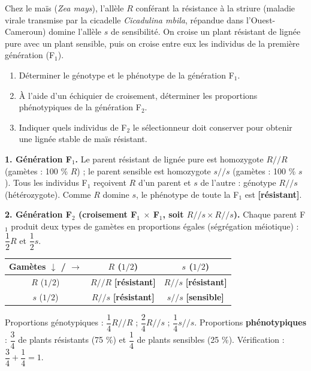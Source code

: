 \documentclass[11pt]{article}
\begin{document}
\begin{exoresolu}
Chez le maïs (\emph{Zea mays}), l'allèle $R$ conférant la résistance à la striure (maladie virale transmise par la cicadelle \emph{Cicadulina mbila}, répandue dans l'Ouest-Cameroun) domine l'allèle $s$ de sensibilité. On croise un plant résistant de lignée pure avec un plant sensible, puis on croise entre eux les individus de la première génération (F$_1$).
\begin{enumerate}
\item Déterminer le génotype et le phénotype de la génération F$_1$.
\item À l'aide d'un échiquier de croisement, déterminer les proportions phénotypiques de la génération F$_2$.
\item Indiquer quels individus de F$_2$ le sélectionneur doit conserver pour obtenir une lignée stable de maïs résistant.
\end{enumerate}
\tcblower
\textbf{1. Génération F$_1$.} Le parent résistant de lignée pure est homozygote $R/\!/R$ (gamètes : 100 \% $R$) ; le parent sensible est homozygote $s/\!/s$ (gamètes : 100 \% $s$). Tous les individus F$_1$ reçoivent $R$ d'un parent et $s$ de l'autre : génotype $R/\!/s$ (hétérozygote). Comme $R$ domine $s$, le phénotype de toute la F$_1$ est \textbf{[résistant]}.

\textbf{2. Génération F$_2$ (croisement F$_1$ $\times$ F$_1$, soit $R/\!/s \times R/\!/s$).} Chaque parent F$_1$ produit deux types de gamètes en proportions égales (ségrégation méiotique) : $\dfrac{1}{2} R$ et $\dfrac{1}{2} s$.

\begin{center}
\begin{tabular}{|c|c|c|}
\hline
\rowcolor{popblueL} Gamètes $\downarrow$ / $\rightarrow$ & $R$ ($1/2$) & $s$ ($1/2$) \\
\hline
$R$ ($1/2$) & $R/\!/R$ \textbf{[résistant]} & $R/\!/s$ \textbf{[résistant]} \\
\hline
$s$ ($1/2$) & $R/\!/s$ \textbf{[résistant]} & $s/\!/s$ \textbf{[sensible]} \\
\hline
\end{tabular}
\end{center}

Proportions génotypiques : $\dfrac{1}{4} R/\!/R$ ; $\dfrac{2}{4} R/\!/s$ ; $\dfrac{1}{4} s/\!/s$.
Proportions \textbf{phénotypiques} : $\dfrac{3}{4}$ de plants résistants (75 \%) et $\dfrac{1}{4}$ de plants sensibles (25 \%). Vérification : $\dfrac{3}{4} + \dfrac{1}{4} = 1$.


\end{exoresolu}
\end{document}
